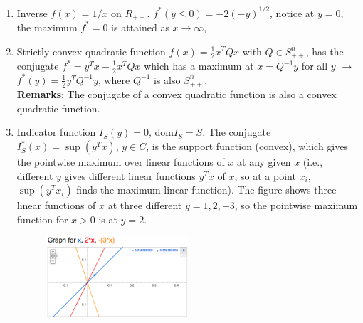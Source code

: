 \begin{enumerate}
  \item{Inverse} $f(x)= 1/x$ on $R_{++}$. $f^*(y\le 0)= -2(-y)^{1/2}$, notice at $y= 0$, the maximum $f^*= 0$ is attained as $x \longrightarrow \infty$, 
  
  \item{Strictly convex quadratic function} $f(x)= \frac{1}{2} x^T Q x$ with $Q\in S_{++}^n$, has the conjugate $f^*= y^Tx - \frac{1}{2} x^T Q x$ which has a maximum at $x= Q^{-1}y$ for all $y$ $\longrightarrow$ $f^*(y)= \frac{1}{2} y^T Q^{-1} y$, where $Q^{-1}$ is also $S_{++}^n$. \\
{\bf Remarks}: The conjugate of a convex quadratic function is also a convex quadratic function.

  \item{Indicator function} $I_S(y)= 0$, $\text{dom}I_S= S$. The conjugate $I_S^*(x)= \sup(y^Tx)$, $y \in C$, is the support function (convex), which gives the pointwise maximum over linear functions of $x$ at any given $x$ (i.e., different $y$ gives different linear functions $y^Tx$ of $x$, so at a point $x_i$, $\sup(y^Tx_i)$ finds the maximum linear function).
  The figure shows three linear functions of $x$ at three different $y=1,2,-3$, so the pointwise maximum function for $x>0$ is at $y=2$. 
  \begin{figure}[H]
     \includegraphics[width=0.5\textwidth]{conj_ind}
  \end{figure}
  
\end{enumerate} 

